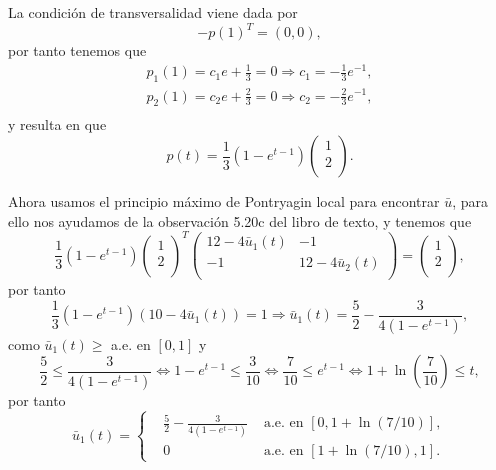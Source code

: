 La condición de transversalidad viene dada por
\begin{equation*}
    - p(1)^T = (0, 0),
\end{equation*}
por tanto tenemos que
\begin{equation*}
\begin{aligned}
    p_1 (1) = c_1 e + \frac{1}{3} = 0 \Rightarrow c_1 = - \frac{1}{3} e^{-1}, \\
    p_2 (1) = c_2 e + \frac{2}{3} = 0 \Rightarrow c_2 = - \frac{2}{3} e^{-1}, \\
\end{aligned}
\end{equation*}
y resulta en que
\begin{equation*}
    p(t) = \frac{1}{3} (1 - e^{t - 1})
        \begin{pmatrix}
            1 \\
            2 \\
        \end{pmatrix}.
\end{equation*}

Ahora usamos el principio máximo de Pontryagin local para encontrar $\bar{u}$,
para ello nos ayudamos de la observación 5.20c del libro de texto,
y tenemos que
\begin{equation*}
    \frac{1}{3} (1 - e^{t - 1})
        \begin{pmatrix}
            1 \\
            2 \\
        \end{pmatrix}^T
        \begin{pmatrix}
            12 - 4 \bar{u}_1(t) & -1 \\
            -1 & 12 - 4 \bar{u}_2(t) \\
        \end{pmatrix}
    =
        \begin{pmatrix}
            1 \\
            2 \\
        \end{pmatrix},
\end{equation*}
por tanto
\begin{equation*}
    \frac{1}{3} (1 - e^{t - 1}) (10 - 4 \bar{u}_1 (t)) = 1
    \Rightarrow \bar{u}_1 (t) = \frac{5}{2} - \frac{3}{4 (1 - e^{t - 1})},
\end{equation*}
como $\bar{u}_1(t) \geq$ a.e. en $[0,1]$ y
\begin{equation*}
    \frac{5}{2} \leq \frac{3}{4 (1 - e^{t - 1})}
    \Leftrightarrow 1 - e^{t - 1} \leq \frac{3}{10}
    \Leftrightarrow \frac{7}{10} \leq e^{t-1}
    \Leftrightarrow 1 + \ln \left(\frac{7}{10}\right) \leq t,
\end{equation*}
por tanto
\begin{equation*}
    \bar{u}_1 (t) = \left\{
    \begin{aligned}
        & \frac{5}{2} - \frac{3}{4 (1 - e^{t - 1})} & \text{ a.e. en } [0, 1 + \ln(7/10)], \\
        & 0  & \text{ a.e. en } [1 + \ln(7/10), 1].
    \end{aligned}
    \right.
\end{equation*}

